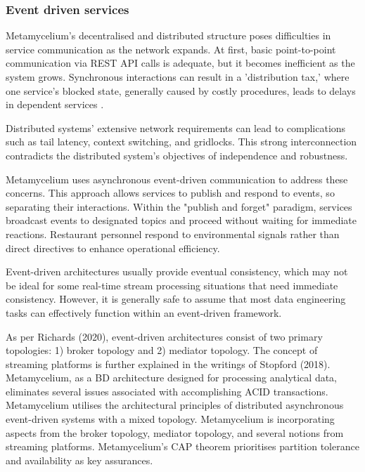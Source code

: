 \documentclass[preprint,12pt]{elsarticle}
\begin{document}
\subsubsection{Event driven services}

Metamycelium's decentralised and distributed structure poses difficulties in service communication as the network expands. At first, basic point-to-point communication via REST API calls is adequate, but it becomes inefficient as the system grows. Synchronous interactions can result in a 'distribution tax,' where one service's blocked state, generally caused by costly procedures, leads to delays in dependent services \cite{montesi2016circuit}.

Distributed systems' extensive network requirements can lead to complications such as tail latency, context switching, and gridlocks. This strong interconnection contradicts the distributed system's objectives of independence and robustness.

Metamycelium uses asynchronous event-driven communication to address these concerns. This approach allows services to publish and respond to events, so separating their interactions. Within the "publish and forget" paradigm, services broadcast events to designated topics and proceed without waiting for immediate reactions. Restaurant personnel respond to environmental signals rather than direct directives to enhance operational efficiency.

Event-driven architectures usually provide eventual consistency, which may not be ideal for some real-time stream processing situations that need immediate consistency. However, it is generally safe to assume that most data engineering tasks can effectively function within an event-driven framework.

As per Richards (2020), event-driven architectures consist of two primary topologies: 1) broker topology and 2) mediator topology. The concept of streaming platforms is further explained in the writings of Stopford (2018). Metamycelium, as a BD architecture designed for processing analytical data, eliminates several issues associated with accomplishing ACID transactions. Metamycelium utilises the architectural principles of distributed asynchronous event-driven systems with a mixed topology. Metamycelium is incorporating aspects from the broker topology, mediator topology, and several notions from streaming platforms. Metamycelium's CAP theorem prioritises partition tolerance and availability as key assurances. 
\end{document}
